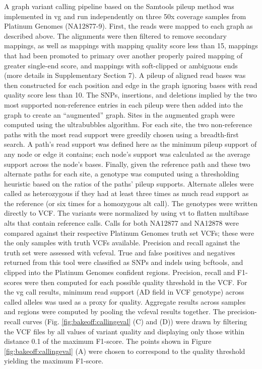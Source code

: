 A graph variant calling pipeline based on the Samtools pileup method was
implemented in vg and run independently on three 50x coverage samples
from Platinum Genomes (NA12877-9). First, the reads were mapped to each
graph as described above. The alignments were then filtered to remove
secondary mappings, as well as mappings with mapping quality score less
than 15, mappings that had been promoted to primary over another
properly paired mapping of greater single-end score, and mappings with
soft-clipped or ambiguous ends (more details in Supplementary Section
7). A pileup of aligned read bases was then constructed for each
position and edge in the graph ignoring bases with read quality score
less than 10. The SNPs, insertions, and deletions implied by the two
most supported non-reference entries in each pileup were then added into
the graph to create an ``augmented'' graph. Sites in the augmented graph
were computed using the ultrabubbles
algorithm\cite{paten2017superbubbles}. For each site, the two
non-reference paths with the most read support were greedily chosen
using a breadth-first search. A path's read support was defined here as
the minimum pileup support of any node or edge it contains; each node's
support was calculated as the average support across the node's bases.
Finally, given the reference path and these two alternate paths for each
site, a genotype was computed using a thresholding heuristic based on
the ratios of the paths' pileup supports. Alternate alleles were called
as heterozygous if they had at least three times as much read support as
the reference (or six times for a homozygous alt call). The genotypes
were written directly to VCF. The variants were normalized by using
vt\cite{Tan2015-fv} to flatten multibase alts that contain reference
calls. Calls for both NA12877 and NA12878 were compared against their
respective Platinum Genomes truth set VCFs; these were the only samples
with truth VCFs available. Precision and recall against the truth set
were assessed with vcfeval\cite{Cleary2015-oy}. True and false positives
and negatives returned from this tool were classified as SNPs and indels
using bcftools, and clipped into the Platinum Genomes confident regions.
Precision, recall and F1-scores were then computed for each possible
quality threshold in the VCF. For the vg call results, minimum read
support (AD field in VCF genotype) across called alleles was used as a
proxy for quality. Aggregate results across samples and regions were
computed by pooling the vcfeval results together. The precision-recall
curves (Fig. \ref{fig:bakeoff:callingeval} (C) and (D)) were drawn by filtering the VCF files by all
values of variant quality and displaying only those within distance 0.1
of the maximum F1-score. The points shown in Figure \ref{fig:bakeoff:callingeval} (A) were chosen to
correspond to the quality threshold yielding the maximum F1-score.

